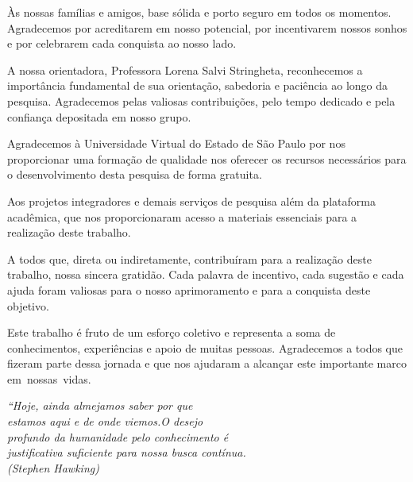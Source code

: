 \documentclass[
12pt,
 a4paper,
    english,
    brazil,
    oneside
    ]{abntex2}
\begin{document}
\begin{agradecimentos}
	Às nossas famílias e amigos, base sólida e porto seguro em todos os momentos. Agradecemos por acreditarem em nosso potencial, por incentivarem nossos sonhos e por celebrarem cada conquista ao nosso lado.

	A nossa orientadora, Professora Lorena Salvi Stringheta, reconhecemos a importância fundamental de sua orientação, sabedoria e paciência ao longo da pesquisa. Agradecemos pelas valiosas contribuições, pelo tempo dedicado e pela confiança depositada em nosso grupo.

	Agradecemos à Universidade Virtual do Estado de São Paulo por nos proporcionar uma formação de qualidade nos oferecer os recursos necessários para o desenvolvimento desta pesquisa de forma gratuita.

	Aos projetos integradores e demais serviços de pesquisa além da plataforma acadêmica, que nos proporcionaram acesso a materiais essenciais para a realização deste trabalho.

	A todos que, direta ou indiretamente, contribuíram para a realização deste trabalho, nossa sincera gratidão. Cada palavra de incentivo, cada sugestão e cada ajuda foram valiosas para o nosso aprimoramento e para a conquista deste objetivo.

	Este trabalho é fruto de um esforço coletivo e representa a soma de conhecimentos, experiências e apoio de muitas pessoas. Agradecemos a todos que fizeram parte dessa jornada e que nos ajudaram a alcançar este importante marco em nossas vidas.
\end{agradecimentos}

\begin{epigrafe}
	\vspace*{\fill}
	\begin{flushright}
		\textit{``Hoje, ainda almejamos saber por que\\
			estamos aqui e de onde viemos.O desejo\\
			profundo da humanidade pelo	conhecimento é\\
			justificativa suficiente para nossa busca contínua.\\
			(Stephen Hawking)}
	\end{flushright}
\end{epigrafe}
\end{document}
